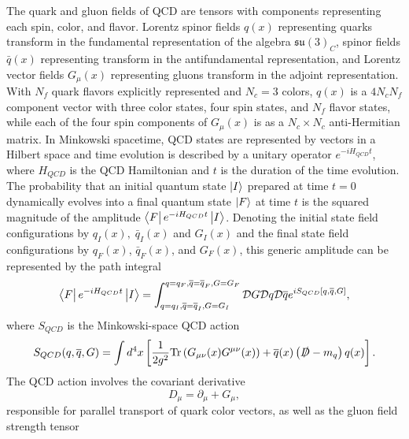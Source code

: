 The quark and gluon fields of QCD are tensors with components representing each spin, color, and flavor.
Lorentz spinor fields $q(x)$ representing quarks transform in the fundamental representation of the algebra $\mathfrak{su}(3)_C$, spinor fields $\bar{q}(x)$ representing  transform in the antifundamental representation, and Lorentz vector fields $G_\mu(x)$ representing gluons transform in the adjoint representation.
With $N_f$ quark flavors explicitly represented and $N_c=3$ colors, $q(x)$ is a $4 N_c N_f$ component vector with three color states, four spin states, and $N_f$ flavor states, while each of the four spin components of $G_\mu(x)$ is as a $N_c\times N_c$ anti-Hermitian matrix.
In Minkowski spacetime,
QCD states are represented by vectors in a Hilbert space
and time evolution is described by a unitary operator $e^{-i H_{QCD} t}$, where $H_{QCD}$ is the QCD Hamiltonian and $t$ is the duration of the time evolution.
The probability that an initial quantum state $\left| I \right>$ prepared at time $t=0$ dynamically evolves into a final quantum state $\left| F \right>$ at time $t$ is the squared magnitude of the amplitude $\mbraket{F}{e^{-iH_{QCD}t}}{I}$.
Denoting the initial state field configurations by $q_I(x),\;\bar{q}_I(x)$ and $G_I(x)$ and the final state field configurations by $q_F(x)$, $\bar{q}_F(x)$, and $G_F(x)$, this generic amplitude can be represented by the path integral
\begin{equation}
  \begin{split}
    \mbraket{F}{e^{-iH_{QCD}t}}{I} = \int_{q=q_I,\bar{q}=\bar{q}_I,G=G_I}^{q=q_F,\bar{q}=\bar{q}_F,G=G_F} \mathcal{D}G\mathcal{D}q\mathcal{D}\bar{q} e^{iS_{QCD}[q,\bar{q},G]},
  \end{split}\label{eq:pathintegraldef}
\end{equation}
where $S_{QCD}$ is the Minkowski-space QCD action
\begin{equation}
  \begin{split}
    S_{QCD}(q,\overline{q},G) = \int d^4x \left[ \frac{1}{2g^2}\text{Tr}\left(G_{\mu\nu}(x)G^{\mu\nu}(x)\right)  + \overline{q}(x)\left(\slashed{D} - m_q\right)q(x)\right].
  \end{split}\label{eq:minkowskiactiondef}
\end{equation}
The QCD action involves the covariant derivative
\begin{equation}
  D_\mu = \partial_\mu + G_\mu,
  \label{eq:covariantderivativedef}
\end{equation}
responsible for parallel transport of quark color vectors, as well as the gluon field strength tensor
